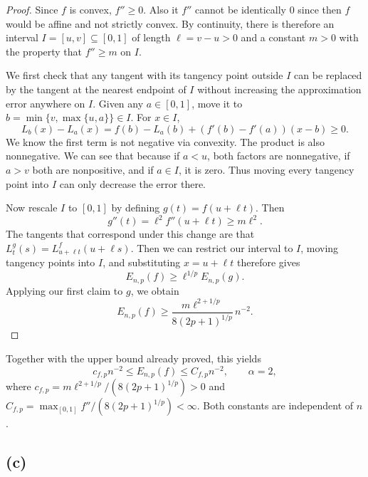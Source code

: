 \documentclass[11pt]{scrartcl}
\begin{document}
\begin{soln}
\begin{proof}
Since $f$ is convex, $f''\ge0$. Also 
it $f''$ cannot be identically $0$ since then $f$ would be 
affine and not strictly convex. By continuity, there is therefore an interval
$I=[u,v]\subseteq[0,1]$ of length $\ell=v-u>0$ and a constant
$m>0$ with the property that $f''\ge m$ on $I$.

We first check that any tangent with its tangency point outside $I$
can be replaced by the tangent at the nearest endpoint of $I$
without increasing the approximation error anywhere on $I$. Given any $a\in[0,1]$, move it to
$b=\min\{v,\max\{u,a\}\}\in I$. For $x\in I$,
\[
L_b(x)-L_a(x)
=f(b)-L_a(b)+(f'(b)-f'(a))(x-b)\ge0.
\]
We know the first term is not negative via convexity. The product is
also nonnegative. We can see that because if $a<u$, both factors are nonnegative,
if $a>v$ both are nonpositive, and if $a\in I$, it is zero.
Thus moving every tangency point into $I$ can only decrease
the error there.

Now rescale $I$ to $[0,1]$ by defining
$g(t)=f(u+\ell t)$. Then
\[
g''(t)=\ell^2 f''(u+\ell t)\ge m\ell^2.
\]
The tangents that correspond under this change are that $L_t^g(s)=L_{u+\ell t}^f(u+\ell s)$.
Then we can restrict our interval to $I$, moving tangency points
into $I$, and substituting $x=u+\ell t$ therefore gives
\[
E_{n,p}(f)\ge \ell^{1/p}E_{n,p}(g).
\]
Applying our first claim to $g$, we obtain
\[
E_{n,p}(f)\ge
\frac{m\ell^{2+1/p}}{8(2p+1)^{1/p}}\,n^{-2}.
\]
\end{proof}
Together with the upper bound already proved, this yields
\[
\boxed{
c_{f,p}n^{-2}\le E_{n,p}(f)\le C_{f,p}n^{-2},
\qquad \alpha=2,
}
\]
where
$c_{f,p}=m\ell^{2+1/p}/(8(2p+1)^{1/p})>0$ and
$C_{f,p}=\max_{[0,1]}f''/(8(2p+1)^{1/p})<\infty$.
Both constants are independent of $n$.
\end{soln}
\subsection{(c)}
\end{document}
